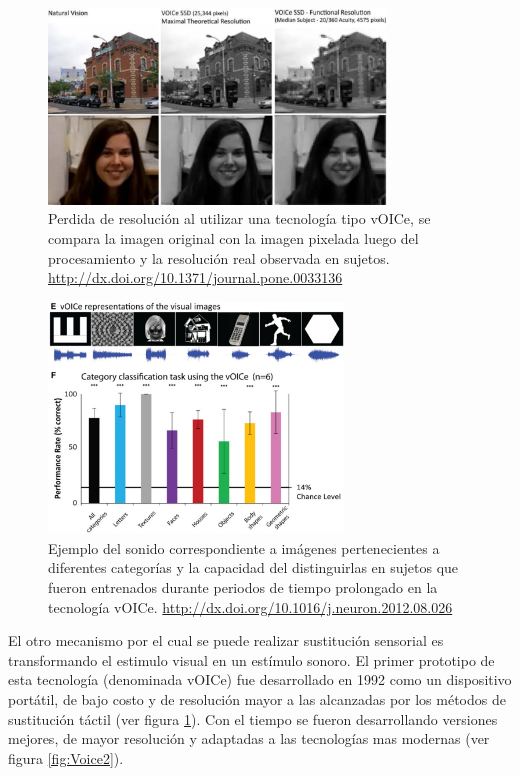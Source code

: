 \documentclass{article}
\begin{document}
    \begin{figure}
        \center
        \includegraphics[width=0.8\textwidth]{Imagenes/ImagenVoice1.png}
        \caption{Perdida de resolución al utilizar una tecnología tipo vOICe, se compara la imagen original con la imagen pixelada luego del procesamiento y la resolución real observada en sujetos. \url{http://dx.doi.org/10.1371/journal.pone.0033136}}
        \label{fig:Voice1}
    \end{figure}
    
    \begin{figure}
        \center
        \includegraphics[width=0.7\textwidth]{Imagenes/Voice3.png}
        \caption{Ejemplo del sonido correspondiente a imágenes pertenecientes a diferentes categorías y la capacidad del distinguirlas en sujetos que fueron entrenados durante periodos de tiempo prolongado en la tecnología vOICe. \url{http://dx.doi.org/10.1016/j.neuron.2012.08.026}}
        \label{fig:Voice3}
    \end{figure}
    
    
    El otro mecanismo por el cual se puede realizar sustitución sensorial es transformando el estimulo visual en un estímulo sonoro. El primer prototipo de esta tecnología (denominada vOICe) fue desarrollado en 1992 \cite{Voice1} como un dispositivo portátil, de bajo costo y de resolución mayor a las alcanzadas por los métodos de sustitución táctil (ver figura \ref{fig:Voice1}). Con el tiempo se fueron desarrollando versiones mejores, de mayor resolución y adaptadas a las tecnologías mas modernas (ver figura \ref{fig:Voice2}).
    
\end{document}
